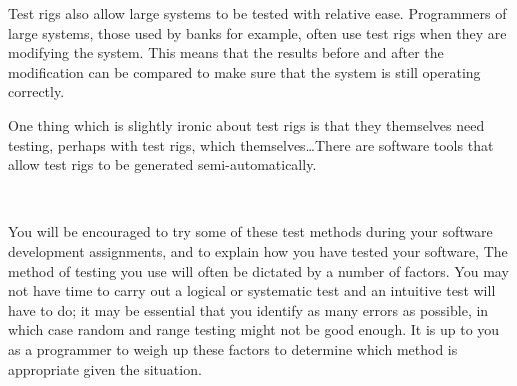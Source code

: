 Test rigs also allow large systems to be tested with relative
ease. Programmers of large systems, those used by banks for example,
often use test rigs  
when they are modifying the system. This means that the results before
and after  the modification can be compared to make sure that the
system is still  operating correctly. 

One thing which is slightly ironic about test rigs is that they
themselves need testing, perhaps with test rigs, which
themselves\ldots There are software tools that allow test rigs to be
generated semi-automatically.

~

You will be encouraged to try some of these test methods during your
software development assignments, and to explain how you have tested
your software,
The method of testing you use will often be dictated by a number of factors. 
You may not have time to carry out a logical or systematic test and an
intuitive test will have to do; it may be essential that you identify
as many errors as  
possible, in which case random and range testing might not be good enough. It 
is up to you as a programmer to weigh up these factors to determine which 
method is appropriate given the situation. 
 
